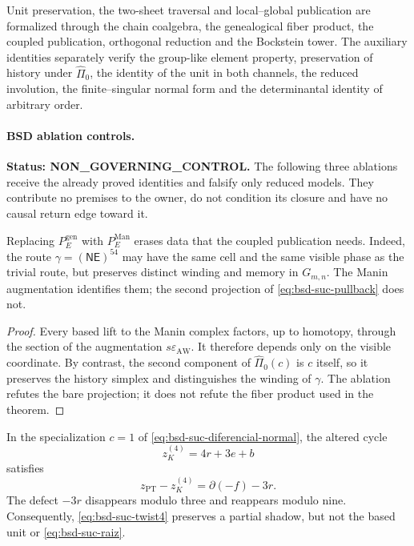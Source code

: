 Unit preservation, the two-sheet traversal and local--global
publication are formalized through the chain coalgebra, the genealogical
fiber product, the coupled publication, orthogonal reduction and the
Bockstein tower. The auxiliary identities separately verify the group-like element property,
preservation of history under \(\widehat\Pi_0\), the identity of the
unit in both channels, the reduced involution, the finite--singular normal
form and the determinantal identity of arbitrary order.

\paragraph{BSD ablation controls.}
\noindent\textbf{Status: NON\_GOVERNING\_CONTROL.}
The following three ablations receive the already proved identities and
falsify only reduced models. They contribute no premises to the owner,
do not condition its closure and have no causal return edge toward it.

\begin{ablation}
\label{abl:bsd-suc-manin}
Replacing \(P_E^{\mathrm{gen}}\) with \(P_E^{\mathrm{Man}}\) erases data that
the coupled publication needs. Indeed, the route
\(\gamma=(\mathsf N\mathsf E)^{54}\) may have the same cell and the same
visible phase as the trivial route, but preserves distinct winding and memory
in \(G_{m,n}\). The Manin augmentation identifies them; the second
projection of \eqref{eq:bsd-suc-pullback} does not.
\end{ablation}

\begin{proof}
Every based lift to the Manin complex factors, up to homotopy, through the
section of the augmentation \(s\varepsilon_{\mathrm{AW}}\). It therefore depends only
on the visible coordinate. By contrast, the second component of
\(\widehat\Pi_0(c)\) is \(c\) itself, so it preserves the history
simplex and distinguishes the winding of \(\gamma\). The ablation refutes the
bare projection; it does not refute the fiber product used in the theorem.
\end{proof}

\begin{ablation}
\label{abl:bsd-suc-twist}
In the specialization \(c=1\) of
\eqref{eq:bsd-suc-diferencial-normal}, the altered cycle
\begin{equation}\label{eq:bsd-suc-twist4}
 z_K^{(4)}=4r+3e+b
\end{equation}
satisfies
\begin{equation}\label{eq:bsd-suc-twist-defecto}
 z_{\mathrm{PT}}-z_K^{(4)}
 =\partial(-f)-3r.
\end{equation}
The defect \(-3r\) disappears modulo three and reappears modulo nine.
Consequently, \eqref{eq:bsd-suc-twist4} preserves a partial shadow, but not
the based unit or \eqref{eq:bsd-suc-raiz}.
\end{ablation}

